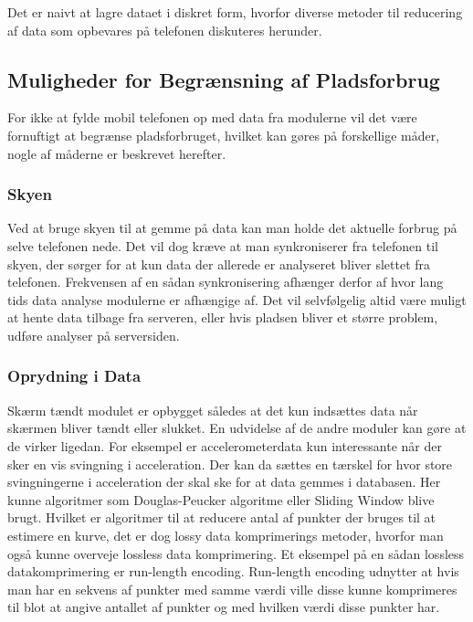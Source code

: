 Det er naivt at lagre dataet i diskret form, hvorfor diverse metoder til reducering af data som opbevares på telefonen diskuteres herunder.

\subsection{Muligheder for Begrænsning af Pladsforbrug}
For ikke at fylde mobil telefonen op med data fra modulerne vil det være fornuftigt at begrænse pladsforbruget, hvilket kan gøres på forskellige måder, nogle af måderne er beskrevet herefter.

\subsubsection{Skyen}
Ved at bruge skyen til at gemme på data kan man holde det aktuelle forbrug på selve telefonen nede.
Det vil dog kræve at man synkroniserer fra telefonen til skyen, der sørger for at kun data der allerede er analyseret bliver slettet fra telefonen. 
Frekvensen af en sådan synkronisering afhænger derfor af hvor lang tids data analyse modulerne er afhængige af.
Det vil selvfølgelig altid være muligt at hente data tilbage fra serveren, eller hvis pladsen bliver et større problem, udføre analyser på serversiden.

\subsubsection{Oprydning i Data}\label{sec:opryd}
Skærm tændt modulet er opbygget således at det kun indsættes data når skærmen bliver tændt eller slukket.
En udvidelse af de andre moduler kan gøre at de virker ligedan. 
For eksempel er accelerometerdata kun interessante når der sker en vis svingning i acceleration.
Der kan da sættes en tærskel for hvor store svingningerne i acceleration der skal ske for at data gemmes i databasen.
Her kunne algoritmer som Douglas-Peucker algoritme eller Sliding Window blive brugt.
Hvilket er algoritmer til at reducere antal af punkter der bruges til at estimere en kurve, det er dog lossy data komprimerings metoder, hvorfor man også kunne overveje lossless data komprimering.
Et eksempel på en sådan lossless datakomprimering er run-length encoding.
Run-length encoding udnytter at hvis man har en sekvens af punkter med samme værdi ville disse kunne komprimeres til blot at angive antallet af punkter og med hvilken værdi disse punkter har.

